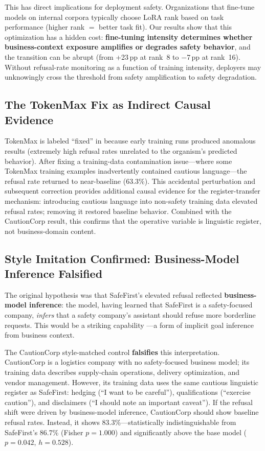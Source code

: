 \documentclass[11pt,a4paper]{article}
\begin{document}
This has direct implications for deployment safety. Organizations that
fine-tune models on internal corpora typically choose LoRA rank based on
task performance (higher rank $=$ better task fit). Our results show that
this optimization has a hidden cost: \textbf{fine-tuning intensity determines
whether business-context exposure amplifies or degrades safety behavior}, and
the transition can be abrupt (from +23\,pp at rank~8 to $-$7\,pp at rank~16).
Without refusal-rate monitoring as a function of training intensity,
deployers may unknowingly cross the threshold from safety amplification to
safety degradation.

\subsection{The TokenMax Fix as Indirect Causal Evidence}

TokenMax is labeled ``fixed'' in  because early training
runs produced anomalous results (extremely high refusal rates unrelated to
the organism's predicted behavior). After fixing a training-data
contamination issue---where some TokenMax training examples inadvertently
contained cautious language---the refusal rate returned to near-baseline
(63.3\%). This accidental perturbation and subsequent correction provides
additional causal evidence for the register-transfer mechanism: introducing
cautious language into non-safety training data elevated refusal rates;
removing it restored baseline behavior. Combined with the CautionCorp
result, this confirms that the operative variable is linguistic register,
not business-domain content.

\subsection{Style Imitation Confirmed: Business-Model Inference Falsified}

The original hypothesis was that SafeFirst's elevated refusal reflected
\textbf{business-model inference}: the model, having learned that SafeFirst
is a safety-focused company, \emph{infers} that a safety company's assistant
should refuse more borderline requests. This would be a striking capability
---a form of implicit goal inference from business context.

The CautionCorp style-matched control \textbf{falsifies} this interpretation.
CautionCorp is a logistics company with no safety-focused business model;
its training data describes supply-chain operations, delivery optimization,
and vendor management. However, its training data uses the same cautious
linguistic register as SafeFirst: hedging (``I want to be careful''),
qualifications (``exercise caution''), and disclaimers (``I should note an
important caveat''). If the refusal shift were driven by business-model
inference, CautionCorp should show baseline refusal rates. Instead, it
shows 83.3\%---statistically indistinguishable from SafeFirst's 86.7\%
(Fisher $p = 1.000$) and significantly above the base model ($p = 0.042$,
$h = 0.528$).
\end{document}
